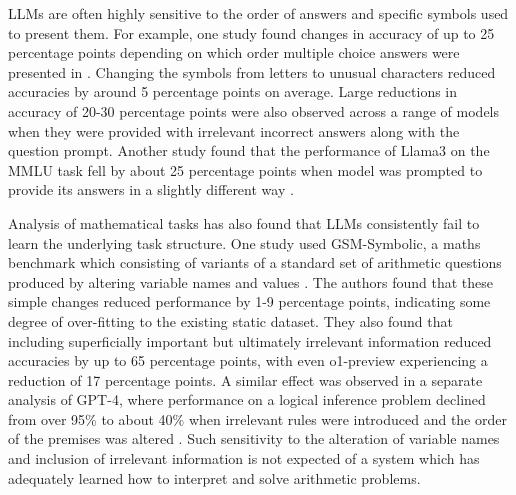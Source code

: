 \documentclass{article}
\begin{document}
LLMs are often highly sensitive to the order of answers and specific symbols used to present them. For example, one study found changes in accuracy of up to 25 percentage points depending on which order multiple choice answers were presented in \citep{alzahrani2024benchmarks}. Changing the symbols from letters to unusual characters reduced accuracies by around 5 percentage points on average. Large reductions in accuracy of 20-30 percentage points were also observed across a range of models when they were provided with irrelevant incorrect answers along with the question prompt. Another study found that the performance of Llama3 on the MMLU task fell by about 25 percentage points when model was prompted to provide its answers in a slightly different way \citep{moore2024base}.

Analysis of mathematical tasks has also found that LLMs consistently fail to learn the underlying task structure. One study used GSM-Symbolic, a maths benchmark which consisting of variants of a standard set of arithmetic questions produced by altering variable names and values \citep{mirzadeh2024gsm}. The authors found that these simple changes reduced performance by 1-9 percentage points, indicating some degree of over-fitting to the existing static dataset. They also found that including superficially important but ultimately irrelevant information reduced accuracies by up to 65 percentage points, with even o1-preview experiencing a reduction of 17 percentage points. A similar effect was observed in a separate analysis of GPT-4, where performance on a logical inference problem declined from over 95\% to about 40\% when irrelevant rules were introduced and the order of the premises was altered \citep{chen2024premise}. Such sensitivity to the alteration of variable names and inclusion of irrelevant information is not expected of a system which has adequately learned how to interpret and solve arithmetic problems.
\end{document}
